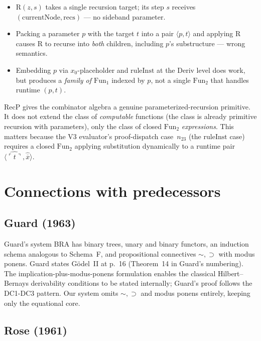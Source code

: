 \documentclass[11pt]{article}
\newcommand{\pair}[2]{\langle #1, #2 \rangle}
\newcommand{\nat}[1]{\overline{#1}}
\newcommand{\code}[1]{\ulcorner #1 \urcorner}
\newcommand{\reify}[1]{\widehat{#1}}
\newcommand{\RecP}{\mathrm{RecP}}
\begin{document}
\begin{itemize}
\item $\mathrm{R}(z, s)$ takes a single recursion target; its step
  $s$ receives $(\mathrm{currentNode}, \mathrm{recs})$ --- no
  sideband parameter.
\item Packing a parameter $p$ with the target $t$ into a pair
  $\pair{p}{t}$ and applying $\mathrm{R}$ causes $\mathrm{R}$ to
  recurse into \emph{both} children, including $p$'s substructure
  --- wrong semantics.
\item Embedding $p$ via $x_0$-placeholder and $\mathrm{ruleInst}$ at
  the Deriv level does work, but produces a \emph{family of $\mathrm{Fun}_1$}
  indexed by $p$, not a single $\mathrm{Fun}_2$ that handles runtime $(p, t)$.
\end{itemize}

$\RecP$ gives the combinator algebra a genuine
parameterized-recursion primitive.  It does not extend the class of
\emph{computable} functions (the class is already primitive
recursion with parameters), only the class of closed
$\mathrm{Fun}_2$ \emph{expressions}.  This matters because the V3
evaluator's proof-dispatch case~$n_{23}$ (the $\mathrm{ruleInst}$
case) requires a closed $\mathrm{Fun}_2$ applying substitution
dynamically to a runtime pair $\pair{\reify{\code{t}}}{\reify{\nat{x}}}$.

\section{Connections with predecessors}

\subsection{Guard (1963)~\cite{guard1963}}

Guard's system BRA has binary trees, unary and binary functors, an
induction schema analogous to Schema~F, and propositional
connectives $\sim, \supset$ with modus ponens.  Guard states
G\"odel~II at p.~16 (Theorem~14 in Guard's numbering).  The
implication-plus-modus-ponens formulation enables the classical
Hilbert--Bernays derivability conditions to be stated internally;
Guard's proof follows the DC1-DC3 pattern.  Our system omits
$\sim, \supset$ and modus ponens entirely, keeping only the
equational core.

\subsection{Rose (1961)~\cite{rose1961}}
\end{document}
